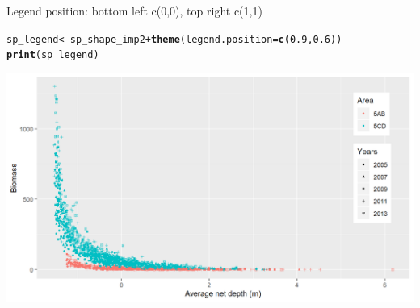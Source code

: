 \documentclass{beamer}\usepackage[]{graphicx}\usepackage[]{color}
\makeatletter
\newcommand{\hlnum}[1]{\textcolor[rgb]{0.686,0.059,0.569}{#1}}%
\newcommand{\hlopt}[1]{\textcolor[rgb]{0,0,0}{#1}}%
\newcommand{\hlstd}[1]{\textcolor[rgb]{0.345,0.345,0.345}{#1}}%
\newcommand{\hlkwb}[1]{\textcolor[rgb]{0.69,0.353,0.396}{#1}}%
\newcommand{\hlkwc}[1]{\textcolor[rgb]{0.333,0.667,0.333}{#1}}%
\newcommand{\hlkwd}[1]{\textcolor[rgb]{0.737,0.353,0.396}{\textbf{#1}}}%
\newenvironment{kframe}{%
 \def\at@end@of@kframe{}%
 \ifinner\ifhmode%
  \def\at@end@of@kframe{\end{minipage}}%
  \begin{minipage}{\columnwidth}%
 \fi\fi%
 \def\FrameCommand##1{\hskip\@totalleftmargin \hskip-\fboxsep
 \colorbox{shadecolor}{##1}\hskip-\fboxsep
     \hskip-\linewidth \hskip-\@totalleftmargin \hskip\columnwidth}%
 \MakeFramed {\advance\hsize-\width
   \@totalleftmargin\z@ \linewidth\hsize
   \@setminipage}}%
 {\par\unskip\endMakeFramed%
 \at@end@of@kframe}
\newenvironment{knitrout}{}{} %
\makeatother
\begin{document}
\begin{frame}[fragile]{Legend position: bottom left c(0,0), top right c(1,1)}
\begin{knitrout}\footnotesize
{}\color{fgcolor}\begin{kframe}
\begin{alltt}
\hlstd{sp_legend} \hlkwb{<-} \hlstd{sp_shape_imp2} \hlopt{+} \hlkwd{theme}\hlstd{(}\hlkwc{legend.position}\hlstd{=}\hlkwd{c}\hlstd{(}\hlnum{0.9}\hlstd{,}\hlnum{0.6}\hlstd{))}
\hlkwd{print}\hlstd{(sp_legend)}
\end{alltt}
\end{kframe}

{\centering \includegraphics[width=.9\linewidth]{figure/legend_p2-1} 

}



\end{knitrout}
\end{frame}
\end{document}
